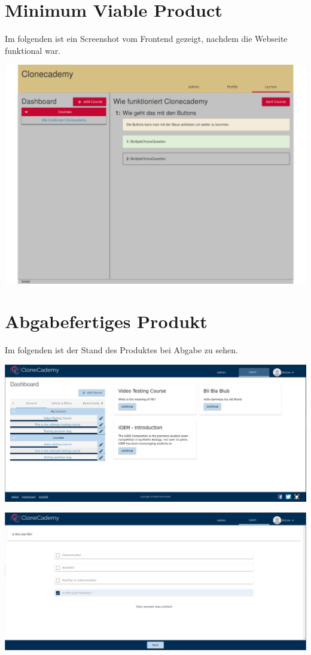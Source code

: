 \documentclass[accentcolor=tud0b,12pt,paper=a4]{tudreport}
\begin{document}
	\section*{Minimum Viable Product}
	Im folgenden ist ein Screenshot vom Frontend gezeigt, nachdem die Webseite funktional war.

	\includegraphics[width=\textwidth]{appendix/screenshots/forntend.png}

	\section*{Abgabefertiges Produkt}
	Im folgenden ist der Stand des Produktes bei Abgabe zu sehen.

	\includegraphics[height=0.3\textheight]{appendix/screenshots/dashboard.jpg}

	\includegraphics[height=0.3\textheight]{appendix/screenshots/screenshot-0.jpg}
\end{document}

